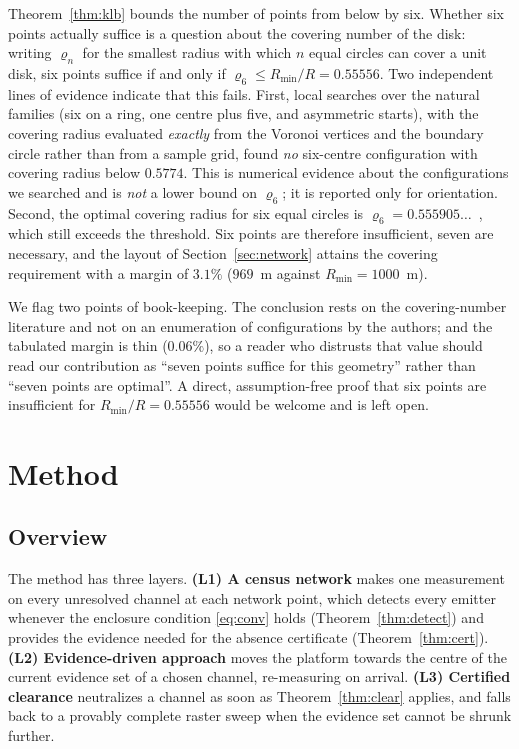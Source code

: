 \documentclass[preprint,12pt,3p]{elsarticle}
\theoremstyle{definition}
\newcommand{\Rmin}{R_{\min}}
\begin{document}
Theorem~\ref{thm:klb} bounds the number of points from below by six. Whether six points actually
suffice is a question about the covering number of the disk: writing $\varrho_n$ for the smallest
radius with which $n$ equal circles can cover a unit disk, six points suffice if and only if
$\varrho_6\le\Rmin/R=0.55556$. Two independent lines of evidence indicate that this fails.
First, local searches over the natural families (six on a ring, one centre plus five, and
asymmetric starts), with the covering radius evaluated \emph{exactly} from the Voronoi vertices
and the boundary circle rather than from a sample grid, found \emph{no} six-centre configuration
with covering radius below $0.5774$. This is numerical evidence about the configurations we
searched and is \emph{not} a lower bound on $\varrho_6$; it is reported only for orientation.
Second, the optimal covering radius for six equal circles is
$\varrho_6=0.555905\ldots$~\cite{bezdek1983,nica2011},
which still exceeds the threshold. Six points are therefore insufficient, seven are necessary,
and the layout of
Section~\ref{sec:network} attains the covering requirement with a margin of $3.1\%$
($969$~m against $\Rmin=1000$~m).

We flag two points of book-keeping. The conclusion rests on the covering-number literature and
not on an enumeration of configurations by the authors; and the tabulated margin is thin
($0.06\%$), so a reader who distrusts that value should read our contribution as ``seven points
suffice for this geometry'' rather than ``seven points are optimal''. A direct, assumption-free
proof that six points are insufficient for $\Rmin/R=0.55556$ would be welcome and is left open.


\section{Method}
\label{sec:method}

\subsection{Overview}
The method has three layers. \textbf{(L1) A census network} makes one measurement on every
unresolved channel at each network point, which detects every emitter whenever the enclosure
condition \eqref{eq:conv} holds (Theorem~\ref{thm:detect}) and provides the evidence needed for the
absence certificate
(Theorem~\ref{thm:cert}). \textbf{(L2) Evidence-driven approach} moves the platform towards the
centre of the current evidence set of a chosen channel, re-measuring on arrival. \textbf{(L3)
Certified clearance} neutralizes a channel as soon as Theorem~\ref{thm:clear} applies, and falls
back to a provably complete raster sweep when the evidence set cannot be shrunk further.
\end{document}
